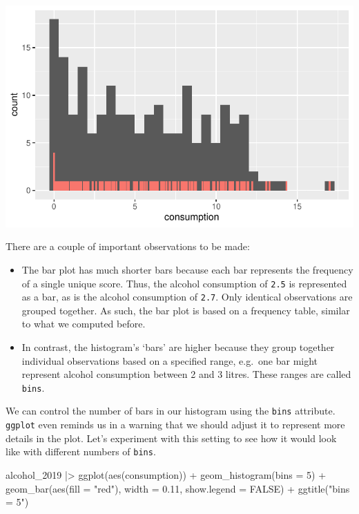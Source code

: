 \documentclass[
  letterpaper,
  DIV=11,
  numbers=noendperiod]{scrreprt}
\newenvironment{Shaded}{\begin{snugshade}}{\end{snugshade}}
\newcommand{\AttributeTok}[1]{\textcolor[rgb]{0.40,0.45,0.13}{#1}}
\newcommand{\ConstantTok}[1]{\textcolor[rgb]{0.56,0.35,0.01}{#1}}
\newcommand{\DecValTok}[1]{\textcolor[rgb]{0.68,0.00,0.00}{#1}}
\newcommand{\FloatTok}[1]{\textcolor[rgb]{0.68,0.00,0.00}{#1}}
\newcommand{\FunctionTok}[1]{\textcolor[rgb]{0.28,0.35,0.67}{#1}}
\newcommand{\NormalTok}[1]{\textcolor[rgb]{0.00,0.23,0.31}{#1}}
\newcommand{\SpecialCharTok}[1]{\textcolor[rgb]{0.37,0.37,0.37}{#1}}
\newcommand{\StringTok}[1]{\textcolor[rgb]{0.13,0.47,0.30}{#1}}
\begin{document}
\includegraphics{08_descriptive_statistics_files/figure-latex/histogram-vs-barplot-1.pdf}

There are a couple of important observations to be made:

\begin{itemize}
\item
  The bar plot has much shorter bars because each bar represents the
  frequency of a single unique score. Thus, the alcohol consumption of
  \texttt{2.5} is represented as a bar, as is the alcohol consumption of
  \texttt{2.7}. Only identical observations are grouped together. As
  such, the bar plot is based on a frequency table, similar to what we
  computed before.
\item
  In contrast, the histogram's `bars' are higher because they group
  together individual observations based on a specified range, e.g.~one
  bar might represent alcohol consumption between 2 and 3 litres. These
  ranges are called \texttt{bins}.
\end{itemize}

We can control the number of bars in our histogram using the
\texttt{bins} attribute. \texttt{ggplot} even reminds us in a warning
that we should adjust it to represent more details in the plot. Let's
experiment with this setting to see how it would look like with
different numbers of \texttt{bins}.

\begin{Shaded}
\begin{Highlighting}[]
\NormalTok{  alcohol\_2019 }\SpecialCharTok{|\textgreater{}}
  \FunctionTok{ggplot}\NormalTok{(}\FunctionTok{aes}\NormalTok{(consumption)) }\SpecialCharTok{+}
  \FunctionTok{geom\_histogram}\NormalTok{(}\AttributeTok{bins =} \DecValTok{5}\NormalTok{) }\SpecialCharTok{+}
  \FunctionTok{geom\_bar}\NormalTok{(}\FunctionTok{aes}\NormalTok{(}\AttributeTok{fill =} \StringTok{"red"}\NormalTok{), }\AttributeTok{width =} \FloatTok{0.11}\NormalTok{, }\AttributeTok{show.legend =} \ConstantTok{FALSE}\NormalTok{) }\SpecialCharTok{+}
  \FunctionTok{ggtitle}\NormalTok{(}\StringTok{"bins = 5"}\NormalTok{)}
\end{Highlighting}
\end{Shaded}
\end{document}
